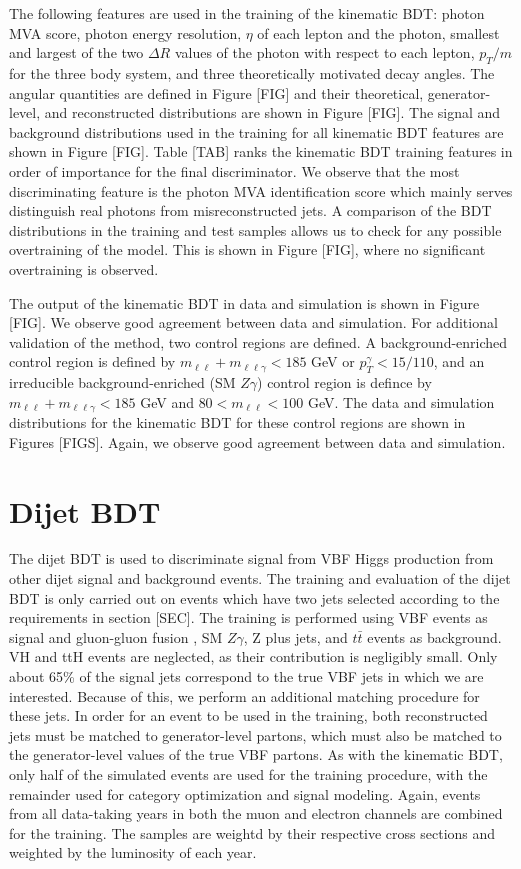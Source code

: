 The following features are used in the training of the kinematic BDT: photon MVA score, photon energy resolution, $\eta$ of each 
lepton and the photon, smallest and largest of the two $\Delta R$ values of the photon with respect to each lepton, $p_{T}/m$ for the 
three body system, and three theoretically motivated decay angles. The angular quantities are defined in Figure [FIG] and their 
theoretical, generator-level, and reconstructed distributions are shown in Figure [FIG]. The signal and background distributions
used in the training for all kinematic BDT features are shown in Figure [FIG]. Table [TAB] ranks the kinematic BDT 
training features in order of importance for the final discriminator. We observe that the most discriminating feature is the photon 
MVA identification score which mainly serves distinguish real photons from misreconstructed jets. A comparison of the BDT 
distributions in the training and test samples allows us to check for any possible overtraining of the model. This is shown in 
Figure [FIG], where no significant overtraining is observed. 

The output of the kinematic 
BDT in data and simulation is shown in Figure [FIG]. We observe good agreement between data and simulation. For additional 
validation of the method, two control regions are defined. A background-enriched control region is defined by 
$m_{\ell\ell} + m_{\ell\ell\gamma} < 185$ GeV or $p_{T}^{\gamma} < 15/110$, and an irreducible background-enriched (SM $Z\gamma$) 
control region is defince by $m_{\ell\ell} + m_{\ell\ell\gamma} < 185$ GeV and $80 < m_{\ell\ell} < 100$ GeV. The data and simulation
distributions for the kinematic BDT for these control regions are shown in Figures [FIGS]. Again, we observe good agreement 
between data and simulation.

\section{Dijet BDT}
The dijet BDT is used to discriminate signal from VBF Higgs production from other dijet signal and background events. The training
and evaluation of the dijet BDT is only carried out on events which have two jets selected according to the requirements in 
section [SEC]. The training is performed using VBF \hzg events as signal and gluon-gluon fusion \hzg, SM $Z\gamma$, Z plus jets, and 
$t\bar{t}$ events as background. VH and ttH \hzg events are neglected, as their contribution is negligibly small. Only about 65\% 
of the signal jets correspond to the true VBF jets in which we are interested. Because of this, we perform an additional matching 
procedure for these jets. In order for an event to be used in the training, both reconstructed jets must be matched 
to generator-level partons, which must also be matched to the generator-level \pt values of the true VBF partons. As with the 
kinematic BDT, only half of the simulated events are used for the training procedure, with the remainder used for category optimization
and signal modeling. Again, events from all data-taking years in both the muon and electron channels are combined for the training. 
The samples are weightd by their respective cross sections and weighted by the luminosity of each year. 

